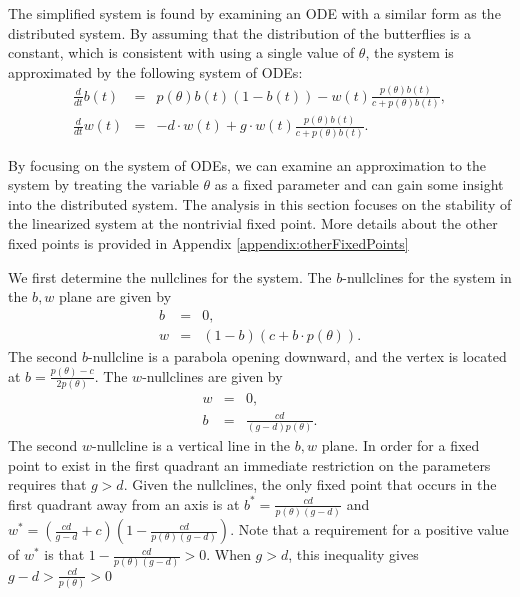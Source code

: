 \documentclass[review]{elsarticle}
\begin{document}
The simplified system is found by examining an ODE with a similar form
as the distributed system. By assuming that the distribution of the
butterflies is a constant, which is consistent with using a single
value of $\theta$, the system is approximated by the following system
of ODEs:
\begin{eqnarray}
  \label{eq:scaledODE1}
  \frac{d}{dt} b(t) & = &
      p(\theta) b(t) (1 - b(t))
      -  w(t) \frac{p(\theta) b(t)}{c+p(\theta)b(t)}, \\
  \label{eq:scaledODE2}
  \frac{d}{dt} w(t) & = & -d \cdot w(t) +
       g \cdot w(t) \frac{p(\theta) b(t) }{c + p(\theta) b(t)}.
\end{eqnarray}

By focusing on the system of ODEs, we can examine an approximation to
the system by treating the variable $\theta$ as a fixed parameter and
can gain some insight into the distributed system. The analysis in
this section focuses on the stability of the linearized system at the
nontrivial fixed point. More details about the other fixed points is
provided in Appendix \ref{appendix:otherFixedPoints}

We first determine the nullclines for the system.
The $b$-nullclines for the system in the $b,w$ plane are given by
\begin{eqnarray}
  \label{eq:bnullclines}
  b & = & 0, \\
  w & = & (1-b)(c+b\cdot p(\theta)).
\end{eqnarray}
The second $b$-nullcline is a parabola opening downward, and the vertex is located at
$b=\frac{p(\theta)-c}{2p(\theta)}$. The $w$-nullclines are given by
\begin{eqnarray}
  \label{eq:wnullclines}
  w & = & 0, \\
  b & = & \frac{cd}{(g-d)p(\theta)}.
\end{eqnarray}
The second $w$-nullcline is a vertical line in the $b,w$ plane. In
order for a fixed point to exist in the first quadrant an immediate
restriction on the parameters requires that $g>d$.  Given the
nullclines, the only fixed point that occurs in the first quadrant
away from an axis is at $b^*=\frac{cd}{p(\theta)(g-d)}$ and
$w^*=\left(\frac{cd}{g-d}+c\right)\left(1-\frac{cd}{p(\theta)(g-d)}\right)$.
Note that a requirement for a positive value of $w^*$ is that
$1-\frac{cd}{p(\theta)(g-d)}>0$.  When $g>d$, this inequality gives $g-d >\frac{cd}{p(\theta)} >0$
\end{document}
